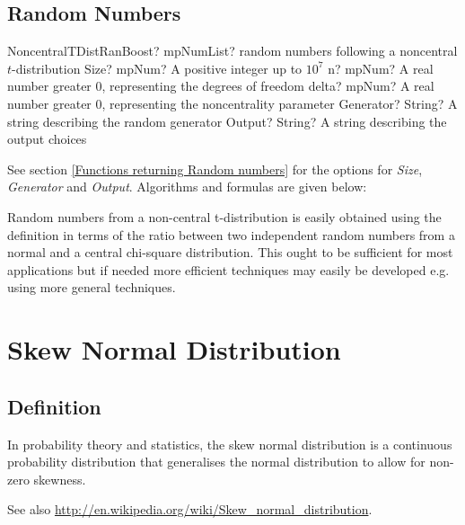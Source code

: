 \subsection{Random Numbers}
\label{NoncentraltDistributionRandomBoost}

\begin{mpFunctionsExtract}
	\mpFunctionFive
	{NoncentralTDistRanBoost? mpNumList? random numbers following a noncentral $t$-distribution}
	{Size? mpNum? A positive integer up to $10^7$}
	{n? mpNum? A real number greater 0, representing the degrees of freedom}
	{delta? mpNum? A real number greater 0, representing the noncentrality parameter}
	{Generator? String? A string describing the random generator}
	{Output? String? A string describing the output choices}
\end{mpFunctionsExtract}


\vspace{0.3cm}
See section \ref{Functions returning Random numbers} for the options for  {\itshape\sffamily Size},  {\itshape\sffamily Generator} and {\itshape\sffamily Output}. Algorithms and formulas are given below:

\vspace{0.3cm}
Random numbers from a non-central t-distribution is easily obtained using the definition in terms of the ratio between two independent random numbers from a normal and a central chi-square distribution. This ought to be sufficient for most applications but if needed more efficient techniques may easily be developed e.g. using more general techniques.





\section{Skew Normal Distribution}

\subsection{Definition}
\label{SkewNormalDistributionDefinition}

In probability theory and statistics, the skew normal distribution is a continuous probability distribution that generalises the normal distribution to allow for non-zero skewness.

See also \href{http://en.wikipedia.org/wiki/Skew_normal_distribution}{http://en.wikipedia.org/wiki/Skew\_normal\_distribution}. 


